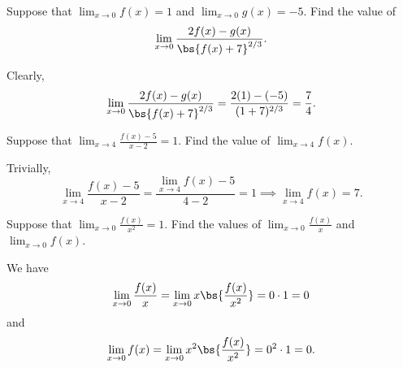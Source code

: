 \begin{problem}
    Suppose that $\displaystyle\lim_{x \to 0} f(x) = 1$ and $\displaystyle\lim_{x \to 0} g(x) = -5$. Find the value of \[\lim_{x \to 0} \frac{2f(x) - g(x)}{\bs{f(x) + 7}^{2/3}}.\]
\end{problem}
\begin{solution}
    Clearly, \[\lim_{x \to 0} \frac{2f(x) - g(x)}{\bs{f(x) + 7}^{2/3}} = \frac{2(1) - (-5)}{(1 + 7)^{2/3}} = \frac74.\]
\end{solution}

\begin{problem}
    Suppose that $\displaystyle\lim_{x \to 4} \frac{f(x) - 5}{x-2} = 1$. Find the value of $\displaystyle\lim_{x \to 4} f(x)$.
\end{problem}
\begin{solution}
    Trivially, \[\lim_{x \to 4} \frac{f(x) - 5}{x-2} = \frac{\lim_{x \to 4} f(x) - 5}{4 - 2} = 1 \implies \lim_{x \to 4} f(x) = 7.\]
\end{solution}

\begin{problem}
    Suppose that $\displaystyle\lim_{x \to 0} \frac{f(x)}{x^2} = 1$. Find the values of $\displaystyle\lim_{x \to 0} \frac{f(x)}{x}$ and $\displaystyle\lim_{x \to 0} f(x)$.
\end{problem}
\begin{solution}
    We have \[\lim_{x \to 0} \frac{f(x)}{x} = \lim_{x \to 0} x\bs{\frac{f(x)}{x^2}} = 0 \cdot 1 = 0\] and \[\lim_{x \to 0} f(x) = \lim_{x \to 0} x^2 \bs{\frac{f(x)}{x^2}} = 0^2 \cdot 1 = 0.\]
\end{solution}

